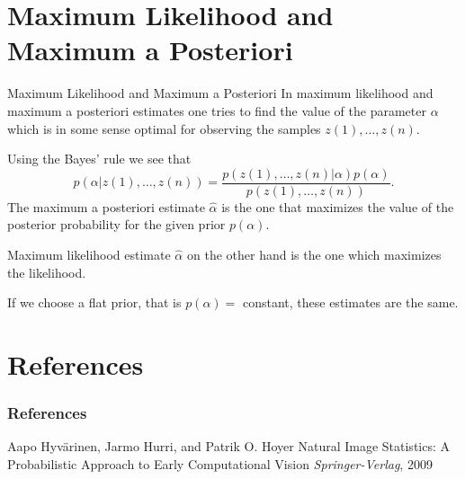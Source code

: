 \documentclass{beamer}
\begin{document}
\section{Maximum Likelihood and Maximum a Posteriori}

\begin{frame}{Maximum Likelihood and Maximum a Posteriori}
  In maximum likelihood and maximum a posteriori estimates one tries to find
  the value of the parameter $\alpha$ which is in some sense optimal for
  observing the samples $z(1), \ldots , z(n)$.

  Using the Bayes' rule we see that
  \[
  p(\alpha| z(1), \ldots , z(n)) = \frac{p(z(1), \ldots , z(n)|\alpha)p(\alpha)}{p(z(1), \ldots , z(n))}.
  \]
  The maximum a posteriori estimate $\hat{\alpha}$ is the one that maximizes
  the value of the posterior probability for the given prior $p(\alpha)$.

  Maximum likelihood estimate $\hat{\alpha}$ on the other hand is the one which
  maximizes the likelihood.

  If we choose a flat prior, that is $p(\alpha) =$ constant, these estimates are
  the same.
\end{frame}

\section{References}

\begin{frame}
\frametitle{References}
\footnotesize{
\begin{thebibliography}{09}
 Aapo Hyvärinen, Jarmo Hurri, and Patrik O. Hoyer
\newblock Natural Image Statistics: A Probabilistic Approach to Early Computational Vision
\newblock \emph{Springer-Verlag}, 2009
\end{thebibliography}
}
\end{frame}
\end{document}
